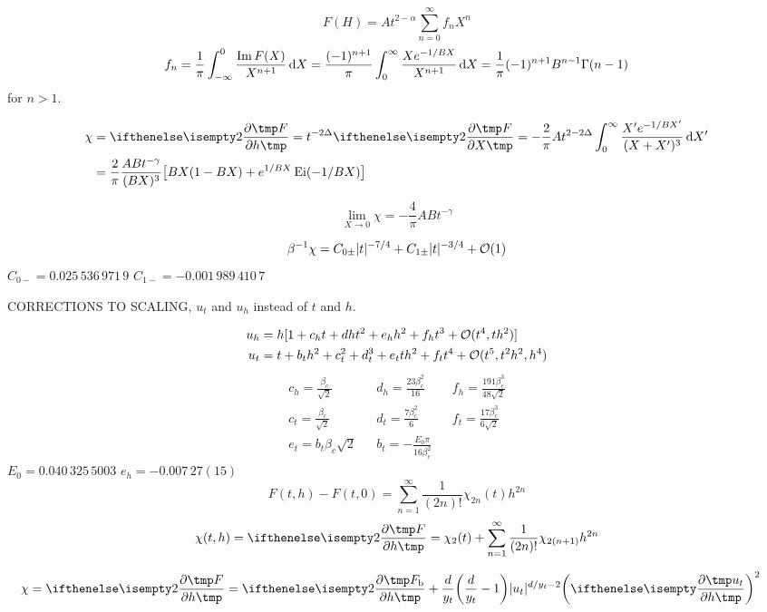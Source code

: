 \documentclass[fleqn]{article}
\begin{document}
\[
  F(H)=At^{2-\alpha}\sum_{n=0}^\infty f_nX^n
\]
\[
  f_n=\frac1\pi\int_{-\infty}^0\frac{\mathop{\mathrm{Im}}\nolimits F(X)}{X^{n+1}}\,\mathrm d X
  =\frac{(-1)^{n+1}}\pi\int_0^{\infty}\frac{Xe^{-1/BX}}{X^{n+1}}\,\mathrm d X
  =\frac1\pi(-1)^{n+1}B^{n-1}\Gamma(n-1)
\]
for $n>1$. 

\begin{align}
  \chi
  &=\pd[2]Fh
  =t^{-2\Delta}\pd[2]FX
  =-\frac{2}\pi At^{2-2\Delta}\int_0^\infty\frac{X'e^{-1/BX'}}{(X+X')^3}\,\dd
  X'\\
  &=\frac2\pi
  \frac{ABt^{-\gamma}}{(BX)^3}\big[BX(1-BX)+e^{1/BX}\ei(-1/BX)\big]
\end{align}

\[
  \lim_{X\to0}\chi=-\frac4\pi ABt^{-\gamma}
\]

\[
  \beta^{-1}\chi=C_{0\pm}|t|^{-7/4}+C_{1\pm}|t|^{-3/4}+\mathcal O(1)
\]
$C_{0-}=0.025\,536\,971\,9$ $C_{1-}=-0.001\,989\,410\,7$
\cite{barouch.1973.susceptibility}

CORRECTIONS TO SCALING, $u_t$ and $u_h$ instead of $t$ and $h$.

\begin{align}
  u_h
  &=h[1+c_ht+dht^2+e_hh^2+f_ht^3+\mathcal O(t^4,th^2)]\\
  u_t
  &=t+b_th^2+c_t^2+d_t^3+e_tth^2+f_tt^4+\mathcal O(t^5,t^2h^2,h^4)
\end{align}
\begin{align}
  c_h=\frac{\beta_c}{\sqrt2}
  &&
  d_h=\frac{23\beta_c^2}{16}
  &&
  f_h=\frac{191\beta_c^3}{48\sqrt2}\\
  c_t=\frac{\beta_c}{\sqrt2}
  &&
  d_t=\frac{7\beta_c^2}6
  &&
  f_t=\frac{17\beta_c^3}{6\sqrt2}\\
  e_t=b_t\beta_c\sqrt2
  &&
  b_t=-\frac{E_0\pi}{16\beta_c^2}
\end{align}
$E_0=0.040\,325\,5003$ $e_h=-0.007\,27(15)$
\[
  F(t,h)-F(t,0)=\sum_{n=1}^\infty\frac1{(2n)!}\chi_{2n}(t)h^{2n}
\]
\[
  \chi(t,h)=\pd[2]Fh=\chi_2(t)+\sum_{n=1}^\infty\frac1{(2n)!}\chi_{2(n+1)}h^{2n}
\]

\begin{align}
  \chi
  &=\pd[2]Fh
  =\pd[2]{F_\b}h
  +\frac d{y_t}\bigg(\frac d{y_t}-1\bigg)|u_t|^{d/y_t-2}\bigg(\pd{u_t}h\bigg)^2
\end{align}





\end{document}
